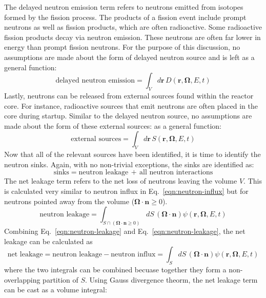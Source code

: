 The delayed neutron emission term refers to neutrons emitted from isotopes formed by the fission process. The products of a fission event include prompt neutrons as well as fission products, which are often radioactive. Some radioactive fission products decay via neutron emission. These neutrons are often far lower in energy than prompt fission neutrons. For the purpose of this discussion, no assumptions are made about the form of delayed neutron source and is left as a general function:
\begin{equation}
\text{delayed neutron emission} = \int_V d\mathbf{r} \, D(\mathbf{r}, \mathbf{\Omega}, E, t)
\end{equation}
Lastly, neutrons can be released from external sources found within the reactor core. For instance, radioactive sources that emit neutrons are often placed in the core during startup. Similar to the delayed neutron source, no assumptions are made about the form of these external sources:
as a general function:
\begin{equation}
\text{external sources} = \int_V d\mathbf{r} \, S(\mathbf{r}, \mathbf{\Omega}, E, t)
\end{equation}
Now that all of the relevant sources have been identified, it is time to identify the neutron sinks. Again, with no non-trivial exceptions, the sinks are identified as:
\begin{equation}
\text{sinks} = \text{neutron leakage} \, + \, \text{all neutron interactions}
\end{equation}
The net leakage term refers to the net loss of neutrons leaving the volume $V$. This is calculated very similar to neutron influx in Eq.~\ref{eqn:neutron-influx} but for neutrons pointed away from the volume ($\mathbf{\Omega} \cdot \mathbf{n} \geq 0$).
\begin{equation}
\text{neutron leakage} = \int_{S \cap \left(\mathbf{\Omega} \cdot \mathbf{n} \geq 0 \right)} dS \, \left(\mathbf{\Omega} \cdot \mathbf{n} \right) \psi(\mathbf{r}, \mathbf{\Omega}, E, t)
\label{eqn:neutron-leakage}
\end{equation}
Combining Eq.~\ref{eqn:neutron-leakage} and Eq.~\ref{eqn:neutron-leakage}, the net leakage can be calculated as
\begin{equation}
\text{net leakage} = \text{neutron leakage} - \text{neutron influx} = \int_{S} dS \, \left(\mathbf{\Omega} \cdot \mathbf{n} \right) \psi(\mathbf{r}, \mathbf{\Omega}, E, t)
\label{eqn:net-leakage-surf}
\end{equation}
where the two integrals can be combined becuase together they form a non-overlapping partition of $S$. Using Gauss divergence theorm, the net leakage term can be cast as a volume integral:
